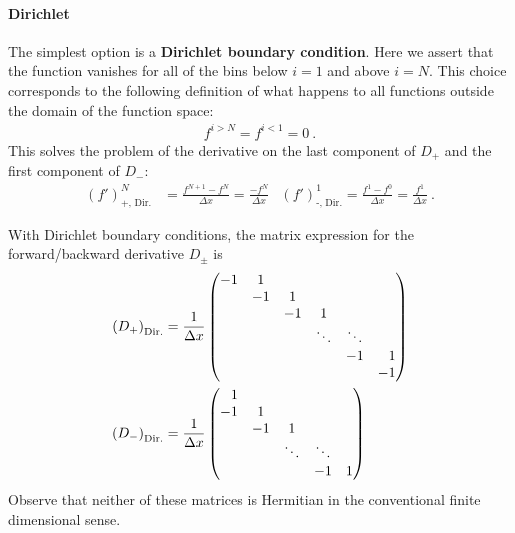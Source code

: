 \paragraph{Dirichlet}
The simplest option is a \textbf{Dirichlet boundary condition}. Here we assert that the function vanishes for all of the bins below $i=1$ and above $i=N$. This choice corresponds to the following definition of what happens to all functions outside the domain of the function space:
\begin{align}
  f^{i > N} = f^{i < 1} = 0 \ .
\end{align}
This solves the problem of the derivative on the last component of $D_+$ and the first component of $D_-$:
\begin{align}
  (f')^N_\text{+, Dir.} &= \frac{f^{N+1} - f^N}{\Delta x} 
  = 
  \frac{- f^N}{\Delta x}  
  &
 (f')^1_\text{-, Dir.} = \frac{f^{1} - f^0}{\Delta x} 
  = 
  \frac{f^1}{\Delta x}
  \ .
\end{align}
\begin{example}
With Dirichlet boundary conditions, the matrix expression for the forward/backward derivative $D_\pm$ is
\begin{align}
    \left(D_+\right)_\text{Dir.}
    &=
    \frac{1}{\Delta x}
    \begin{pmatrix}
        -1 & 1 & & &  \\
        & -1 & 1 & &  \\
        & & -1 & 1 &  \\
        & & & \ddots & \ddots &  \\
        & & & & -1 & \pp 1 \\
        & & & & & -1 
    \end{pmatrix}
    \\
    \left(D_-\right)_\text{Dir.}
    &=
    \frac{1}{\Delta x}
    \begin{pmatrix}
        \pp 1 & & & &  \\
         -1 & 1 & &  \\
        & -1 & 1 &  \\
         & & \ddots & \ddots &  \\
        & & & -1 &  1 
    \end{pmatrix}
\end{align}
Observe that neither of these matrices is Hermitian in the conventional finite dimensional sense.
\end{example}


